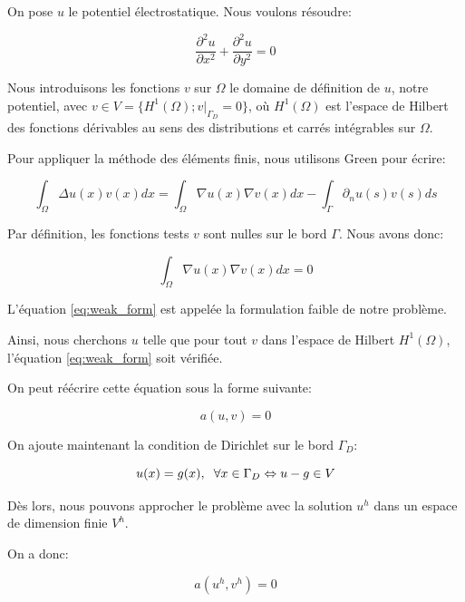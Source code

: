 \documentclass{article}
\begin{document}
On pose $u$ le potentiel électrostatique. Nous voulons résoudre:

\begin{equation}
   \frac{\partial^2 u}{\partial x^2} + \frac{\partial^2 u}{\partial y^2} = 0
\end{equation}

Nous introduisons les fonctions $v$ sur $\Omega$ le domaine de définition de $u$,
notre potentiel, avec $v \in V = \{H^1(\Omega); v|_{\Gamma_D} = 0 \}$, où
$H^1(\Omega)$ est l'espace de Hilbert des fonctions dérivables au sens des
distributions et carrés intégrables sur $\Omega$.

Pour appliquer la méthode des éléments finis, nous utilisons Green
pour écrire:

\begin{equation}
    \int_\Omega \Delta u(x) v(x) dx = \int_\Omega \nabla u(x) \nabla v(x) dx
    - \int_{\Gamma} \partial_n u(s) v(s) ds
\end{equation}

Par définition, les fonctions tests $v$ sont nulles sur le bord $\Gamma$. Nous avons
donc:

\begin{equation}
    \int_\Omega \nabla u(x) \nabla v(x) dx = 0
    \label{eq:weak_form}
\end{equation}

L'équation \ref{eq:weak_form} est appelée la formulation
faible de notre problème.

Ainsi, nous cherchons $u$ telle que pour tout $v$ dans l'espace
de Hilbert $H^1(\Omega)$, l'équation \ref{eq:weak_form} soit vérifiée.

On peut réécrire cette équation sous la forme suivante:

\begin{equation}
    a(u, v) = 0
\end{equation}

On ajoute maintenant la condition de Dirichlet sur le bord $\Gamma_D$:

\begin{equation}
    u(x) = g(x), \hspace{0.2cm} \forall x \in \Gamma_D
    \Leftrightarrow  u-g \in V
\end{equation}

Dès lors, nous pouvons approcher le problème avec la solution 
$u^h$ dans un espace de dimension finie $V^h$.

On a donc:

\begin{equation}
    a(u^h, v^h) = 0
\end{equation}
\end{document}
